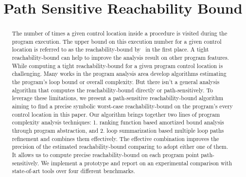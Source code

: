 \documentclass[a4paper,11pt]{article}
\begin{document}
\title{Path Sensitive Reachability Bound}

\author{}

\date{}

\maketitle
%
\begin{abstract}
    The number of times a given control location 
    inside a procedure is visited during the program execution.
    The upper bound on this execution number for 
    a given control location is referred to as the reachability-bound by~\cite{GulwaniZ10} in the first place.
    A tight reachability-bound
    can help to improve the analysis result on other program features.
    While computing a tight reachability-bound for a given program control location is challenging.
    Many works in the program analysis area develop algorithms estimating the program's loop bound or overall complexity.
    But there isn't a general analysis algorithm that
    computes the reachability-bound
    directly or path-sensitively.
    To leverage these limitations,
    we present a path-sensitive reachability-bound algorithm
    aiming to find a precise symbolic worst-case reachability-bound on the program's every control location in this paper.
    Our algorithm brings together two lines of program complexity analysis techniques:
    1. ranking function based amortized bound analysis through program abstraction, and
    2. loop summarization based multiple loop paths refinement
    and combines them effectively. 
    The effective combination improves the precision of the estimated reachability-bound comparing to adopt either one of them.
    It allows us to compute precise reachability-bound on each program point path-sensitively.
    We implement a prototype and report on an experimental comparison with state-of-art tools over four different benchmarks.
\end{abstract}
\end{document}
